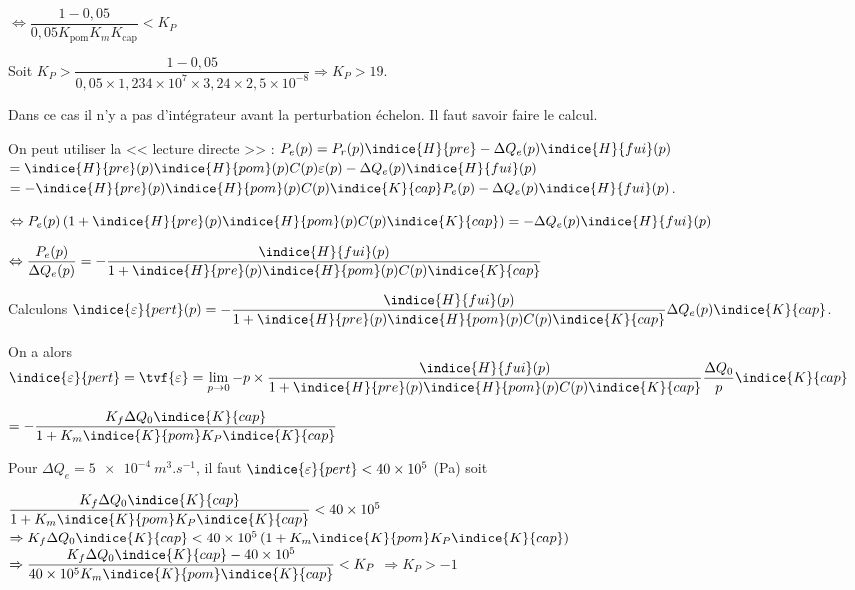 $ \Leftrightarrow \dfrac{1 - 0,05}{0,05 K_{\text{pom}} K_m K_{\text{cap}}}<K_P $

Soit $ K_P > \dfrac{1 - 0,05}{0,05 \times 1,234 \times 10^7\times 3,24 \times  2,5 \times 10^{-8}}  \Rightarrow K_P > 19$.
\else 
\fi

\ifprof
Dans ce cas il n'y a pas d'intégrateur avant la perturbation échelon. Il faut savoir faire le calcul.

On peut utiliser la << lecture directe >> :
$P_e(p)= P_r(p)\indice{H}{pre} - \Delta Q_e(p) \indice{H}{fui}(p)$
$= \indice{H}{pre}(p)\indice{H}{pom}(p) C(p) \varepsilon(p)- \Delta Q_e(p) \indice{H}{fui}(p)$
$= -\indice{H}{pre}(p)\indice{H}{pom}(p) C(p) \indice{K}{cap} P_e(p)- \Delta Q_e(p) \indice{H}{fui}(p)$.

$\Leftrightarrow P_e(p) \left(1+\indice{H}{pre}(p)\indice{H}{pom}(p) C(p) \indice{K}{cap} \right)
=- \Delta Q_e(p) \indice{H}{fui}(p)$


$\Leftrightarrow \dfrac{P_e(p)}{\Delta Q_e(p)} 
=-  \dfrac{\indice{H}{fui}(p)}{1+\indice{H}{pre}(p)\indice{H}{pom}(p) C(p) \indice{K}{cap}}$


Calculons $\indice{\varepsilon}{pert}(p) = -  \dfrac{\indice{H}{fui}(p)}{1+\indice{H}{pre}(p)\indice{H}{pom}(p) C(p) \indice{K}{cap}} \Delta Q_e(p) \indice{K}{cap}$.

On a alors $\indice{\varepsilon}{pert}= \tvf{\varepsilon} 
= \lim\limits_{p\to 0} - p\times  \dfrac{\indice{H}{fui}(p)}{1+\indice{H}{pre}(p)\indice{H}{pom}(p) C(p) \indice{K}{cap}} \dfrac{\Delta Q_0}{p} \indice{K}{cap}$

$= - \dfrac{K_f\Delta Q_0 \indice{K}{cap}}{1+K_m\indice{K}{pom} K_P \indice{K}{cap}} $

\else 
\fi

\ifprof
Pour $\Delta Q_e = \SI{5e-4}{m^3.s^{-1}}$, il faut $\indice{\varepsilon}{pert}<40\times 10^5$ (Pa) soit

$\dfrac{K_f\Delta Q_0 \indice{K}{cap} }{1+K_m\indice{K}{pom} K_P \indice{K}{cap}}  < 40\times 10^5$
$\Rightarrow  K_f\Delta Q_0 \indice{K}{cap}  < 40\times 10^5\left(1+K_m\indice{K}{pom} K_P \indice{K}{cap}\right)$
$\Rightarrow \dfrac{K_f\Delta Q_0 \indice{K}{cap}  -40\times 10^5}{40\times 10^5 K_m\indice{K}{pom} \indice{K}{cap} }< K_P $
$\Rightarrow K_P > -1$
\else 
\fi


